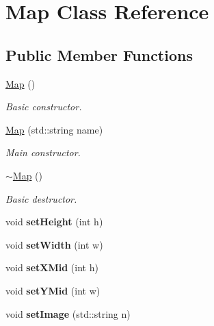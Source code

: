 \hypertarget{class_map}{\section{Map Class Reference}
\label{class_map}
}
\subsection*{Public Member Functions}
\begin{DoxyCompactItemize}
\item 
\hyperlink{class_map_a0f5ad0fd4563497b4214038cbca8b582}{Map} ()
\begin{DoxyCompactList}\small\item\em Basic constructor. \end{DoxyCompactList}\item 
\hyperlink{class_map_aeec3ac95150a6a9df4a417be707bcf9d}{Map} (std\+::string name)
\begin{DoxyCompactList}\small\item\em Main constructor. \end{DoxyCompactList}\item 
\hypertarget{class_map_aa403fbe09394ccf39747588f5168e3b2}{\hyperlink{class_map_aa403fbe09394ccf39747588f5168e3b2}{$\sim$\+Map} ()}\label{class_map_aa403fbe09394ccf39747588f5168e3b2}

\begin{DoxyCompactList}\small\item\em Basic destructor. \end{DoxyCompactList}\item 
\hypertarget{class_map_affab3537641a7985559f83ea083e00ca}{void {\bfseries set\+Height} (int h)}\label{class_map_affab3537641a7985559f83ea083e00ca}

\item 
\hypertarget{class_map_a2915ccde4d8a2ba8142677baea803467}{void {\bfseries set\+Width} (int w)}\label{class_map_a2915ccde4d8a2ba8142677baea803467}

\item 
\hypertarget{class_map_ad42043d8111605dcb97c487e01c01b61}{void {\bfseries set\+X\+Mid} (int h)}\label{class_map_ad42043d8111605dcb97c487e01c01b61}

\item 
\hypertarget{class_map_aaca0d20310990acf6309e022b3f0a97d}{void {\bfseries set\+Y\+Mid} (int w)}\label{class_map_aaca0d20310990acf6309e022b3f0a97d}

\item 
\hypertarget{class_map_a7ac17b33fc7266fcc30b19c33c70c3ca}{void {\bfseries set\+Image} (std\+::string n)}\label{class_map_a7ac17b33fc7266fcc30b19c33c70c3ca}


\end{DoxyCompactItemize}
